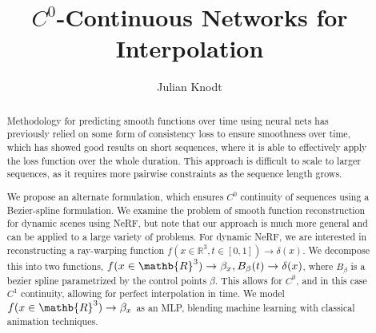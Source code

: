 \documentclass[10pt,twocolumn,letterpaper]{article}
\begin{document}
\title{$C^0$-Continuous Networks for Interpolation}
\author{Julian Knodt}

\begin{abstract}
Methodology for predicting smooth functions over time using neural nets has previously relied on
some form of consistency loss to ensure smoothness over time, which has showed good results on
short sequences, where it is able to effectively apply the loss function over the whole duration.
This approach is difficult to scale to larger sequences, as it requires more pairwise
constraints as the sequence length grows.

We propose an alternate formulation, which ensures $C^0$ continuity of sequences using a
Bezier-spline formulation. We examine the problem of smooth function reconstruction for dynamic
scenes using NeRF, but note that our approach is much more general and can be applied to a large
variety of problems. For dynamic NeRF, we are interested in reconstructing a ray-warping
function $f(x\in\mathbb{R}^3,t\in[0,1])\to\delta(x)$. We decompose this into two functions,
$f(x\in\mathb{R}^3)\to\beta_x, B_\beta(t)\to\delta(x)$, where $B_\beta$ is a bezier spline
parametrized by the control points $\beta$. This allows for $C^0$, and in this case $C^1$ continuity,
allowing for perfect interpolation in time. We model $f(x\in\mathb{R}^3)\to\beta_x$ as an MLP,
blending machine learning with classical animation techniques.
\end{abstract}




\end{document}
